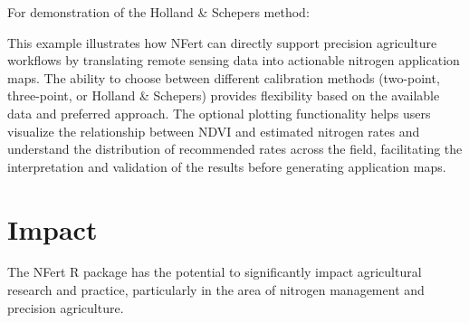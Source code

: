 \documentclass[
  11pt,
]{article}
\newenvironment{Shaded}{\begin{snugshade}}{\end{snugshade}}
\newcommand{\AttributeTok}[1]{\textcolor[rgb]{0.13,0.29,0.53}{#1}}
\newcommand{\CommentTok}[1]{\textcolor[rgb]{0.56,0.35,0.01}{\textit{#1}}}
\newcommand{\ConstantTok}[1]{\textcolor[rgb]{0.56,0.35,0.01}{#1}}
\newcommand{\DecValTok}[1]{\textcolor[rgb]{0.00,0.00,0.81}{#1}}
\newcommand{\FunctionTok}[1]{\textcolor[rgb]{0.13,0.29,0.53}{\textbf{#1}}}
\newcommand{\NormalTok}[1]{#1}
\newcommand{\OtherTok}[1]{\textcolor[rgb]{0.56,0.35,0.01}{#1}}
\begin{document}
For demonstration of the Holland \& Schepers method:

\begin{Shaded}
\end{Shaded}

This example illustrates how NFert can directly support precision
agriculture workflows by translating remote sensing data into actionable
nitrogen application maps. The ability to choose between different
calibration methods (two-point, three-point, or Holland \& Schepers)
provides flexibility based on the available data and preferred approach.
The optional plotting functionality helps users visualize the
relationship between NDVI and estimated nitrogen rates and understand
the distribution of recommended rates across the field, facilitating the
interpretation and validation of the results before generating
application maps.

\section{Impact}\label{impact}

The NFert R package has the potential to significantly impact
agricultural research and practice, particularly in the area of nitrogen
management and precision agriculture.
\end{document}
